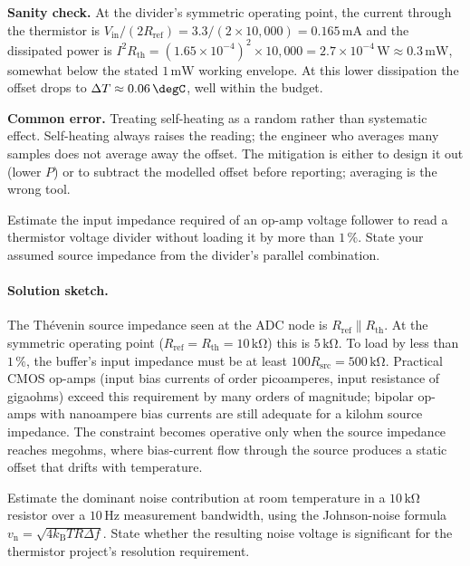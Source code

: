\textbf{Sanity check.} At the divider's symmetric operating point,
the current through the thermistor is $V_{\text{in}}/(2 R_{\text
{ref}}) = 3.3/(2 \times 10{,}000) = 0.165 \,\si{\milli\ampere}$
and the dissipated power is $I^{2} R_{\text{th}} = (1.65 \times
10^{-4})^{2} \times 10{,}000 = 2.7 \times 10^{-4} \,\si{\watt}
\approx 0.3 \,\si{\milli\watt}$, somewhat below the stated $1
\,\si{\milli\watt}$ working envelope. At this lower dissipation
the offset drops to $\Delta T \approx 0.06 \,\degC$, well within
the budget.

\textbf{Common error.} Treating self-heating as a random rather
than systematic effect. Self-heating always raises the reading;
the engineer who averages many samples does not average away the
offset. The mitigation is either to design it out (lower $P$) or
to subtract the modelled offset before reporting; averaging is
the wrong tool.

\begin{exercise}
Estimate the input impedance required of an op-amp voltage follower
to read a thermistor voltage divider without loading it by more
than $1\,\%$. State your assumed source impedance from the divider's
parallel combination.
\end{exercise}

\paragraph{Solution sketch.} The Th\'evenin source impedance seen
at the ADC node is $R_{\text{ref}} \parallel R_{\text{th}}$. At the
symmetric operating point ($R_{\text{ref}} = R_{\text{th}} = 10
\,\si{\kilo\ohm}$) this is $5 \,\si{\kilo\ohm}$. To load by less
than $1\,\%$, the buffer's input impedance must be at least
$100 R_{\text{src}} = 500 \,\si{\kilo\ohm}$. Practical CMOS op-amps
(input bias currents of order picoamperes, input resistance of
gigaohms) exceed this requirement by many orders of magnitude;
bipolar op-amps with nanoampere bias currents are still adequate
for a kilohm source impedance. The constraint becomes operative
only when the source impedance reaches megohms, where bias-current
flow through the source produces a static offset that drifts with
temperature.

\begin{exercise}
Estimate the dominant noise contribution at room temperature in a
$10 \,\si{\kilo\ohm}$ resistor over a $10 \,\si{\hertz}$ measurement
bandwidth, using the Johnson-noise formula
$v_{\text{n}} = \sqrt{4 k_{\text{B}} T R \Delta f}$. State whether
the resulting noise voltage is significant for the thermistor
project's resolution requirement.
\end{exercise}

